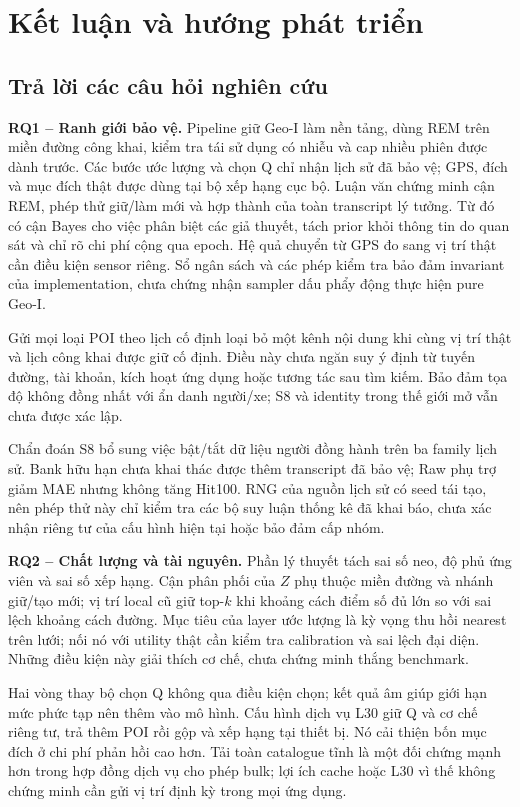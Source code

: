 \chapter{Kết luận và hướng phát triển}
\label{ch:conclusions}

\section{Trả lời các câu hỏi nghiên cứu}

\textbf{RQ1 -- Ranh giới bảo vệ.} Pipeline giữ Geo-I làm nền tảng, dùng REM trên miền đường công khai, kiểm tra tái sử dụng có nhiễu và cap nhiều phiên được dành trước. Các bước ước lượng và chọn Q chỉ nhận lịch sử đã bảo vệ; GPS, đích và mục đích thật được dùng tại bộ xếp hạng cục bộ. Luận văn chứng minh cận REM, phép thử giữ/làm mới và hợp thành của toàn transcript lý tưởng. Từ đó có cận Bayes cho việc phân biệt các giả thuyết, tách prior khỏi thông tin do quan sát và chỉ rõ chi phí cộng qua epoch. Hệ quả chuyển từ GPS đo sang vị trí thật cần điều kiện sensor riêng. Sổ ngân sách và các phép kiểm tra bảo đảm invariant của implementation, chưa chứng nhận sampler dấu phẩy động thực hiện pure Geo-I.

Gửi mọi loại POI theo lịch cố định loại bỏ một kênh nội dung khi cùng vị trí thật và lịch công khai được giữ cố định. Điều này chưa ngăn suy ý định từ tuyến đường, tài khoản, kích hoạt ứng dụng hoặc tương tác sau tìm kiếm. Bảo đảm tọa độ không đồng nhất với ẩn danh người/xe; S8 và identity trong thế giới mở vẫn chưa được xác lập.

Chẩn đoán S8 bổ sung việc bật/tắt dữ liệu người đồng hành trên ba family lịch sử. Bank hữu hạn chưa khai thác được thêm transcript đã bảo vệ; Raw phụ trợ giảm MAE nhưng không tăng Hit100. RNG của nguồn lịch sử có seed tái tạo, nên phép thử này chỉ kiểm tra các bộ suy luận thống kê đã khai báo, chưa xác nhận riêng tư của cấu hình hiện tại hoặc bảo đảm cấp nhóm.

\textbf{RQ2 -- Chất lượng và tài nguyên.} Phần lý thuyết tách sai số neo, độ phủ ứng viên và sai số xếp hạng. Cận phân phối của $Z$ phụ thuộc miền đường và nhánh giữ/tạo mới; vị trí local cũ giữ top-$k$ khi khoảng cách điểm số đủ lớn so với sai lệch khoảng cách đường. Mục tiêu của layer ước lượng là kỳ vọng thu hồi nearest trên lưới; nối nó với utility thật cần kiểm tra calibration và sai lệch đại diện. Những điều kiện này giải thích cơ chế, chưa chứng minh thắng benchmark.

Hai vòng thay bộ chọn Q không qua điều kiện chọn; kết quả âm giúp giới hạn mức phức tạp nên thêm vào mô hình. Cấu hình dịch vụ L30 giữ Q và cơ chế riêng tư, trả thêm POI rồi gộp và xếp hạng tại thiết bị. Nó cải thiện bốn mục đích ở chi phí phản hồi cao hơn. Tải toàn catalogue tĩnh là một đối chứng mạnh hơn trong hợp đồng dịch vụ cho phép bulk; lợi ích cache hoặc L30 vì thế không chứng minh cần gửi vị trí định kỳ trong mọi ứng dụng.

